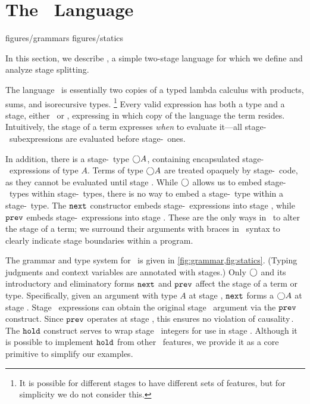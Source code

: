 \section{The \lang\ Language}

 {figures/grammars}
 {figures/statics}

In this section, we describe \lang, a simple two-stage language
for which we define and analyze stage splitting.

The language \lang\ is essentially two copies of a typed lambda calculus with
products, sums, and isorecursive types.%
\footnote{It is possible for different stages to have different sets of
features, but for simplicity we do not consider this.}
Every valid expression has both a type and a stage, either \bbone~or \bbtwo,
expressing in which copy of the language the term resides. Intuitively, the
stage of a term expresses \emph{when} to evaluate it---all stage-\bbone\
subexpressions are evaluated before stage-\bbtwo\ ones.

In addition, there is a stage-\bbone\ type $\bigcirc A$, containing encapsulated
stage-\bbtwo\ expressions of type $A$. Terms of type $\bigcirc A$ are treated
opaquely by stage-\bbone\ code, as they cannot be evaluated until stage \bbtwo.
While $\bigcirc$ allows us to embed stage-\bbtwo\ types within stage-\bbtwo\ types,
there is no way to embed a stage-\bbone\ type within a stage-\bbtwo\ type.
The ${\tt next}$ constructor embeds stage-\bbtwo\ expressions into stage \bbone,
while ${\tt prev}$ embeds stage-\bbone\ expressions into stage \bbtwo.  These are the
only ways in \lang\ to alter the stage of a term; we surround their arguments
with braces in \lang\ syntax to clearly indicate stage boundaries within a
program.

The grammar and type system for \lang\ is given in
\ref{fig:grammar,fig:statics}. (Typing judgments and context variables are annotated with stages.)
Only $\bigcirc$ and its introductory and eliminatory forms ${\tt next}$ and ${\tt prev}$ affect the stage
of a term or type.
Specifically, given an argument with type $A$ at stage \bbtwo, ${\tt next}$ forms a $\bigcirc A$ at stage \bbone.  
Stage \bbtwo\ expressions can obtain the original stage \bbtwo\ argument via the ${\tt prev}$ construct.  
Since ${\tt prev}$ operates at stage \bbtwo, this ensures no violation of causality\,\cite{cave14}.
The ${\tt hold}$ construct serves to wrap stage \bbone\ integers for use in stage \bbtwo.  
Although it is possible to implement ${\tt hold}$ from other \lang\ features, 
we provide it as a core primitive to simplify our examples. 

